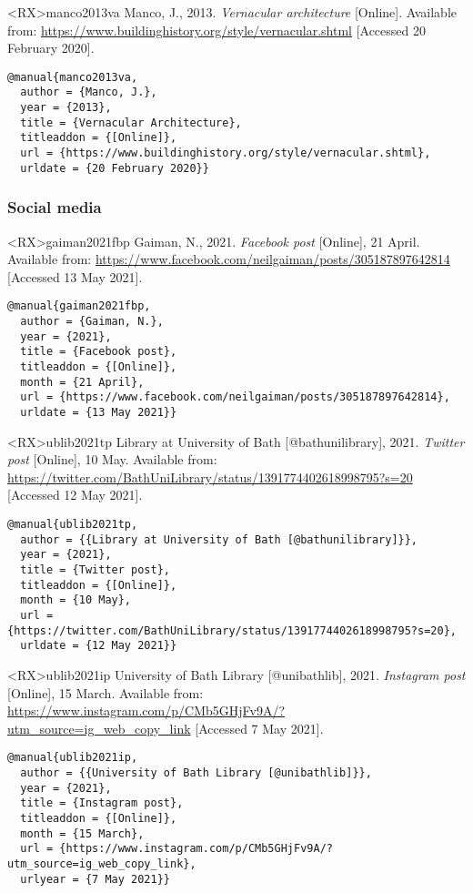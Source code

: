 \documentclass[10pt,a4paper]{article}
\begin{document}
\begin{bibexbox}<RX>{manco2013va}
  Manco, J., 2013. \emph{Vernacular architecture} [Online]. Available from: \url{https://www.buildinghistory.org/style/vernacular.shtml} [Accessed 20 February 2020].
  \tcblower
\begin{Verbatim}
@manual{manco2013va,
  author = {Manco, J.},
  year = {2013},
  title = {Vernacular Architecture},
  titleaddon = {[Online]},
  url = {https://www.buildinghistory.org/style/vernacular.shtml},
  urldate = {20 February 2020}}
\end{Verbatim}
\end{bibexbox}

\subsubsection*{Social media}

\begin{bibexbox}<RX>{gaiman2021fbp}
  Gaiman, N., 2021. \emph{Facebook post} [Online], 21 April. Available from: \url{https://www.facebook.com/neilgaiman/posts/305187897642814} [Accessed 13 May 2021].
  \tcblower
\begin{Verbatim}
@manual{gaiman2021fbp,
  author = {Gaiman, N.},
  year = {2021},
  title = {Facebook post},
  titleaddon = {[Online]},
  month = {21 April},
  url = {https://www.facebook.com/neilgaiman/posts/305187897642814},
  urldate = {13 May 2021}}
\end{Verbatim}
\end{bibexbox}

\begin{bibexbox}<RX>{ublib2021tp}
  Library at University of Bath [@bathunilibrary], 2021. \emph{Twitter post} [Online], 10 May. Available from: \url{https://twitter.com/BathUniLibrary/status/1391774402618998795?s=20} [Accessed 12 May 2021].
  \tcblower
\begin{Verbatim}
@manual{ublib2021tp,
  author = {{Library at University of Bath [@bathunilibrary]}},
  year = {2021},
  title = {Twitter post},
  titleaddon = {[Online]},
  month = {10 May},
  url = {https://twitter.com/BathUniLibrary/status/1391774402618998795?s=20},
  urldate = {12 May 2021}}
\end{Verbatim}
\end{bibexbox}

\begin{bibexbox}<RX>{ublib2021ip}
  University of Bath Library [@unibathlib], 2021. \emph{Instagram post} [Online], 15 March. Available from: \url{https://www.instagram.com/p/CMb5GHjFv9A/?utm_source=ig_web_copy_link} [Accessed 7 May 2021].
  \tcblower
\begin{Verbatim}
@manual{ublib2021ip,
  author = {{University of Bath Library [@unibathlib]}},
  year = {2021},
  title = {Instagram post},
  titleaddon = {[Online]},
  month = {15 March},
  url = {https://www.instagram.com/p/CMb5GHjFv9A/?utm_source=ig_web_copy_link},
  urlyear = {7 May 2021}}
\end{Verbatim}
\end{bibexbox}
\end{document}
